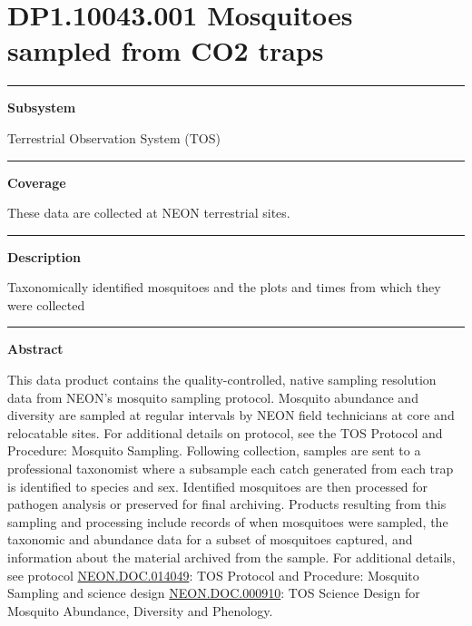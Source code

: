 \documentclass[]{article}
\begin{document}
\section{DP1.10043.001 Mosquitoes sampled from CO2
traps}\label{dp1.10043.001-mosquitoes-sampled-from-co2-traps}

\begin{center}\rule{0.5\linewidth}{\linethickness}\end{center}

\textbf{Subsystem}

Terrestrial Observation System (TOS)

\begin{center}\rule{0.5\linewidth}{\linethickness}\end{center}

\textbf{Coverage}

These data are collected at NEON terrestrial sites.

\begin{center}\rule{0.5\linewidth}{\linethickness}\end{center}

\textbf{Description}

Taxonomically identified mosquitoes and the plots and times from which
they were collected

\begin{center}\rule{0.5\linewidth}{\linethickness}\end{center}

\textbf{Abstract}

This data product contains the quality-controlled, native sampling
resolution data from NEON's mosquito sampling protocol. Mosquito
abundance and diversity are sampled at regular intervals by NEON field
technicians at core and relocatable sites. For additional details on
protocol, see the TOS Protocol and Procedure: Mosquito Sampling.
Following collection, samples are sent to a professional taxonomist
where a subsample each catch generated from each trap is identified to
species and sex. Identified mosquitoes are then processed for pathogen
analysis or preserved for final archiving. Products resulting from this
sampling and processing include records of when mosquitoes were sampled,
the taxonomic and abundance data for a subset of mosquitoes captured,
and information about the material archived from the sample. For
additional details, see protocol
\href{http://data.neonscience.org/api/v0/documents/NEON.DOC.014049vH}{NEON.DOC.014049}:
TOS Protocol and Procedure: Mosquito Sampling and science design
\href{http://data.neonscience.org/api/v0/documents/NEON.DOC.000910vA}{NEON.DOC.000910}:
TOS Science Design for Mosquito Abundance, Diversity and Phenology.
\end{document}
